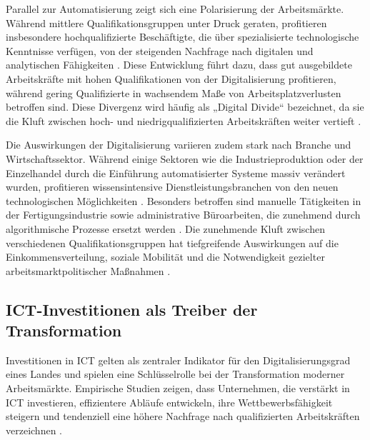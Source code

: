 Parallel zur Automatisierung zeigt sich eine Polarisierung der Arbeitsmärkte. Während mittlere 
Qualifikationsgruppen unter Druck geraten, profitieren insbesondere hochqualifizierte 
Beschäftigte, die über spezialisierte technologische Kenntnisse verfügen, von der steigenden 
Nachfrage nach digitalen und analytischen Fähigkeiten 
\parencite[vgl.][S. 2509]{goos2014explaining}. Diese Entwicklung führt dazu, dass gut 
ausgebildete Arbeitskräfte mit hohen Qualifikationen von der Digitalisierung profitieren, 
während gering Qualifizierte in wachsendem Maße von Arbeitsplatzverlusten betroffen sind. Diese 
Divergenz wird häufig als „Digital Divide“ bezeichnet, da sie die Kluft zwischen hoch- und 
niedrigqualifizierten Arbeitskräften weiter vertieft \parencite[vgl.][S. 188]{oecd2019measuring}.

Die Auswirkungen der Digitalisierung variieren zudem stark nach Branche und
Wirtschaftssektor. Während einige Sektoren wie die Industrieproduktion oder der
Einzelhandel durch die Einführung automatisierter Systeme massiv verändert wurden,
profitieren wissensintensive Dienstleistungsbranchen von den neuen technologischen 
Möglichkeiten \parencite[vgl.][S. 1555]{autor2013thegrowth}. Besonders betroffen sind 
manuelle Tätigkeiten in der Fertigungsindustrie sowie administrative Büroarbeiten, die 
zunehmend durch algorithmische Prozesse ersetzt werden 
\parencite[vgl.][S. 36–38]{frey2013thefuture}. Die zunehmende Kluft zwischen verschiedenen 
Qualifikationsgruppen hat tiefgreifende Auswirkungen auf die Einkommensverteilung, soziale 
Mobilität und die Notwendigkeit gezielter arbeitsmarktpolitischer Maßnahmen 
\parencite[S. 1589–1591]{autor2013thegrowth}.


\subsection{ICT-Investitionen als Treiber der Transformation}

Investitionen in \ac{ICT} gelten als zentraler Indikator für den Digitalisierungsgrad eines 
Landes und spielen eine Schlüsselrolle bei der Transformation moderner Arbeitsmärkte. Empirische 
Studien zeigen, dass Unternehmen, die verstärkt in \ac{ICT} investieren, effizientere Abläufe 
entwickeln, ihre Wettbewerbsfähigkeit steigern und tendenziell eine höhere Nachfrage nach 
qualifizierten Arbeitskräften verzeichnen \parencite[vgl.][S. 30–31]{corrado2018intangible}.

